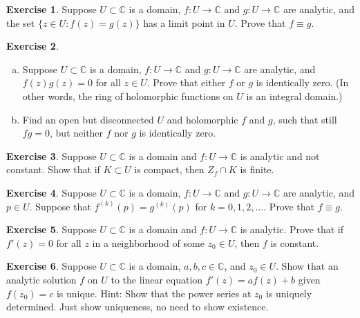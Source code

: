 \documentclass[12pt,openany]{book}
\newcommand{\C}{{\mathbb{C}}}
\theoremstyle{plain}
\theoremstyle{remark}
\theoremstyle{definition}
\newenvironment{exbox}{%
    \def\FrameCommand{\vrule width 1pt \relax\hspace{10pt}}%
    \MakeFramed{\advance\hsize-\width\FrameRestore}%
}{%
    \endMakeFramed
}
\newenvironment{exparts}{%
    \leavevmode\begin{enumerate}[a),noitemsep,topsep=0pt,parsep=0pt,partopsep=0pt]
}{%
    \end{enumerate}
}
\theoremstyle{exercise}
\newtheorem{exercise}{Exercise}[section]
\theoremstyle{example}
\begin{document}
\begin{exbox}
\begin{exercise}
Suppose $U \subset \C$ is a domain,
$f \colon U \to \C$ and $g \colon U \to \C$ are analytic,
and the set $\bigl\{ z \in U : f(z) = g(z) \bigr\}$ has a limit
point in $U$.
Prove that $f \equiv g$.
\end{exercise}

\begin{exercise}
\begin{exparts}
\item
Suppose $U \subset \C$ is a domain,
$f \colon U \to \C$ and $g \colon U \to \C$ are analytic,
and $f(z)g(z) = 0$ for all $z \in U$.
Prove that either $f$ or $g$ is identically zero.
(In other words, the ring of holomorphic functions on $U$ is an integral
domain.)
\item
Find an open but disconnected $U$ and holomorphic $f$ and $g$,
such that still $fg = 0$, but neither $f$ nor $g$ is identically zero.
\end{exparts}
\end{exercise}

\begin{exercise}
Suppose $U \subset \C$ is a domain and $f \colon U \to \C$ is
analytic and not constant.  Show that if $K \subset U$ is compact,
then $Z_f \cap K$ is finite.
\end{exercise}

\begin{exercise}
Suppose $U \subset \C$ is a domain, $f \colon U \to \C$ and $g \colon U \to
\C$ are analytic, and $p \in U$.  Suppose that $f^{(k)}(p) = g^{(k)}(p)$
for $k=0,1,2,\ldots$.  Prove that $f \equiv g$.
\end{exercise}

\begin{exercise}
Suppose $U \subset \C$ is a domain and $f \colon U \to \C$ is analytic.
Prove that if $f'(z) = 0$ for
all $z$ in a neighborhood of some $z_0 \in U$, then $f$ is constant.
\end{exercise}

\begin{exercise}
Suppose $U \subset \C$ is a domain, $a, b, c \in \C$, and $z_0 \in U$.
Show that
an analytic solution $f$ on $U$ to the linear equation $f'(z) = a f(z) + b$
given $f(z_0) = c$ is unique.  Hint: Show that the power series at $z_0$ is uniquely
determined.  Just show uniqueness, no need to show existence.
\end{exercise}
\end{exbox}
\end{document}
